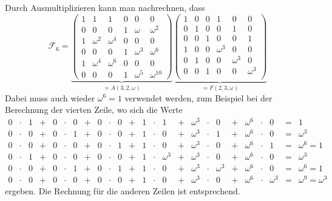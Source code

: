 Durch Ausmultiplizieren kann man nachrechnen, dass
\[
\mathscr{F}_6
=
\underbrace{
\left(\begin{array}{ccc|ccc}
1&       1&       1&      0&       0&          0\\
0&       0&       0&      1&\omega  &   \omega^2\\
\hline
1&\omega^2&\omega^4&      0&       0&          0\\
0&       0&       0&      1&\omega^3&   \omega^6\\
\hline
1&\omega^4&\omega^6&      0&       0&          0\\
0&       0&       0&      1&\omega^5&\omega^{10}
\end{array}\right)
}_{\displaystyle =A(3,2,\omega)}
\underbrace{
\left(\begin{array}{ccc|ccc}
1&0&0&       1&       0&       0\\
0&1&0&       0&       1&       0\\
0&0&1&       0&       0&       1\\
\hline
1&0&0&\omega^3&       0&       0\\
0&1&0&       0&\omega^3&       0\\
0&0&1&       0&       0&\omega^3\\
\end{array}\right)
}_{\displaystyle =F(2,3,\omega)}
\]
Dabei muss auch wieder $\omega^6=1$ verwendet werden, zum Beispiel
bei der Berechnung der vierten Zeile, wo sich die Werte
\[
\renewcommand\arraycolsep{2pt}
\begin{array}{rclcrclcrclcrclcrclcrclcl}
0&\cdot&1 &+& 0&\cdot&0 &+& 0&\cdot&0 &+& 1&\cdot&1 &+& \omega^3&\cdot&0 &+& \omega^6&\cdot&0 &=& 1 \\
0&\cdot&0 &+& 0&\cdot&1 &+& 0&\cdot&0 &+& 1&\cdot&0 &+& \omega^3&\cdot&1 &+& \omega^6&\cdot&0 &=& \omega^3 \\
0&\cdot&0 &+& 0&\cdot&0 &+& 0&\cdot&1 &+& 1&\cdot&0 &+& \omega^3&\cdot&0 &+& \omega^6&\cdot&1 &=& \omega^6 = 1 \\
0&\cdot&1 &+& 0&\cdot&0 &+& 0&\cdot&0 &+& 1&\cdot&\omega^3 &+& \omega^3&\cdot&0 &+& \omega^6&\cdot&0 &=& \omega^3 \\
0&\cdot&0 &+& 0&\cdot&1 &+& 0&\cdot&1 &+& 1&\cdot&0 &+& \omega^3&\cdot&\omega^3 &+& \omega^6&\cdot&0 &=& \omega^6=1 \\
0&\cdot&0 &+& 0&\cdot&0 &+& 0&\cdot&0 &+& 1&\cdot&0 &+& \omega^3&\cdot&0 &+& \omega^6&\cdot&\omega^3 &=& \omega^9=\omega^3 
\end{array}
\]
ergeben.
Die Rechnung für die anderen Zeilen ist entsprechend.

